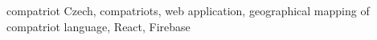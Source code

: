 \documentclass[a4paper,12pt,openany,twoside]{book} %
\begin{document}
compatriot Czech, compatriots, web application, geographical mapping of compatriot language, React, Firebase

\clearpage

\tableofcontents


\cleardoublepage
{}








\clearpage

\pagestyle{plain}

\begin{spacing}{1.05}
\printbibliography[title={Seznam literatury}]
\end{spacing}
\end{document}
